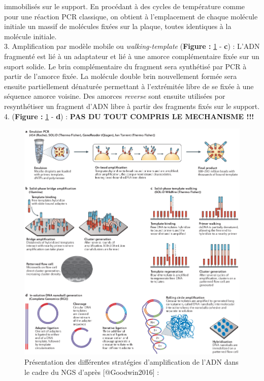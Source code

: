\documentclass[12pt,twoside]{reedthesis}
\theoremstyle{definition}
\theoremstyle{definition}
\theoremstyle{remark}
\begin{document}
  immobilisés sur le support. En procédant à des cycles de température
  comme pour une réaction PCR classique, on obtient à l'emplacement de
  chaque molécule initiale un massif de molécules fixées sur la plaque,
  toutes identiques à la molécule initiale.\\
  3. Amplification par modèle mobile ou \emph{walking-template}
  (\textbf{Figure : }\ref{fig:ngsampli} - \textbf{c}) : L'ADN fragmenté
  est lié à un adaptateur et lié à une amorce complémentaire fixée sur un
  suport solide. Le brin complémentaire du fragment sera synthétisé par
  PCR à partir de l'amorce fixée. La molécule double brin nouvellement
  formée sera ensuite partiellement dénaturée permettant à l'extrémitée
  libre de se fixée à une séquence amorce voisine. Des amorces
  \emph{reverse} sont ensuite utilisées por resynthétiser un fragment
  d'ADN libre à partir des fragments fixés sur le support.\\
  4. (\textbf{Figure : }\ref{fig:ngsampli} - \textbf{d}) : \textbf{PAS DU
  TOUT COMPRIS LE MECHANISME !!! }
  
  \begin{figure}
  
  {\centering \includegraphics[scale=.545]{figure/ngs_amplification} 
  
  }
  
  \caption[Présentation des différentes stratégies d'amplification de l'ADN dans le cadre du NGS]{Présentation des différentes stratégies d'amplification de l'ADN dans le cadre du NGS d'après [@Goodwin2016] : }\label{fig:ngsampli}
  \end{figure}
  
\end{document}
